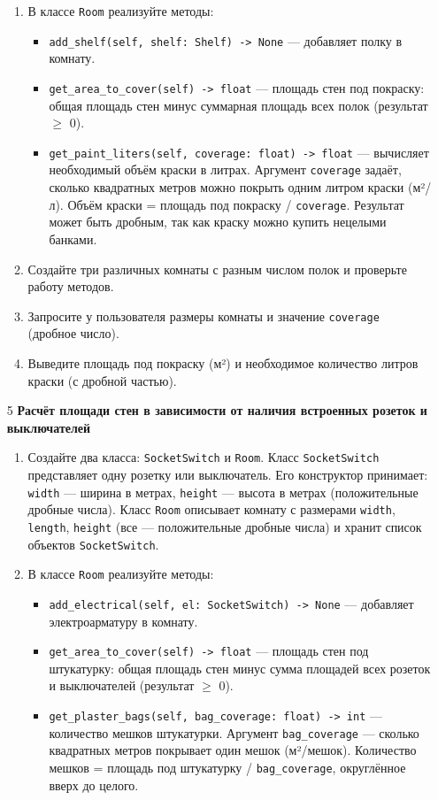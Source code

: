 \begin{enumerate}
\begin{enumerate}
    \item В классе \texttt{Room} реализуйте методы:  
    \begin{itemize}
        \item \texttt{add\_shelf(self, shelf: Shelf) -> None} — добавляет полку в комнату.
        \item \texttt{get\_area\_to\_cover(self) -> float} — площадь стен под покраску: общая площадь стен минус суммарная площадь всех полок (результат $\geqslant$ 0).
        \item \texttt{get\_paint\_liters(self, coverage: float) -> float} — вычисляет необходимый объём краски в литрах. Аргумент \texttt{coverage} задаёт, сколько квадратных метров можно покрыть одним литром краски (м²/л). Объём краски = площадь под покраску / \texttt{coverage}. Результат может быть дробным, так как краску можно купить нецелыми банками.
    \end{itemize}

    \item Создайте три различных комнаты с разным числом полок и проверьте работу методов.

    \item Запросите у пользователя размеры комнаты и значение \texttt{coverage} (дробное число).

    \item Выведите площадь под покраску (м²) и необходимое количество литров краски (с дробной частью).
\end{enumerate}

\item[5] \textbf{Расчёт площади стен в зависимости от наличия встроенных розеток и выключателей}
\begin{enumerate}
    \item Создайте два класса: \texttt{SocketSwitch} и \texttt{Room}.  
    Класс \texttt{SocketSwitch} представляет одну розетку или выключатель. Его конструктор принимает:  
    \texttt{width} — ширина в метрах,  
    \texttt{height} — высота в метрах (положительные дробные числа).  
    Класс \texttt{Room} описывает комнату с размерами \texttt{width}, \texttt{length}, \texttt{height} (все — положительные дробные числа) и хранит список объектов \texttt{SocketSwitch}.

    \item В классе \texttt{Room} реализуйте методы:  
    \begin{itemize}
        \item \texttt{add\_electrical(self, el: SocketSwitch) -> None} — добавляет электроарматуру в комнату.
        \item \texttt{get\_area\_to\_cover(self) -> float} — площадь стен под штукатурку: общая площадь стен минус сумма площадей всех розеток и выключателей (результат $\geqslant$ 0).
        \item \texttt{get\_plaster\_bags(self, bag\_coverage: float) -> int} — количество мешков штукатурки. Аргумент \texttt{bag\_coverage} — сколько квадратных метров покрывает один мешок (м²/мешок). Количество мешков = площадь под штукатурку / \texttt{bag\_coverage}, округлённое вверх до целого.
    \end{itemize}


\end{enumerate}
\end{enumerate}
